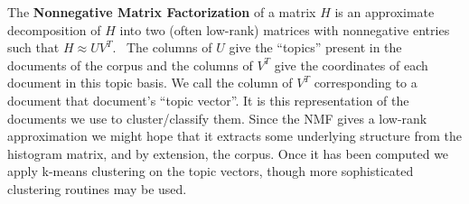\documentclass[fleqn,10pt]{../SelfArx} %
\begin{document}
The \textbf{Nonnegative Matrix Factorization} of a matrix $H$ is an approximate decomposition of $H$ into two (often low-rank) matrices with nonnegative entries such that $H\approx UV^T$.\
The columns of $U$ give the ``topics'' present in the documents of the corpus and the columns of $V^T$ give the coordinates of each document in this topic basis. We call the column of $V^T$ corresponding to a document that document's ``topic vector''. It is this representation of the documents we use to cluster/classify them. Since the NMF gives a low-rank approximation we might hope that it extracts some underlying structure from the histogram matrix, and by extension, the corpus. Once it has been computed we apply k-means clustering on the topic vectors, though more sophisticated clustering routines may be used.
\end{document}

